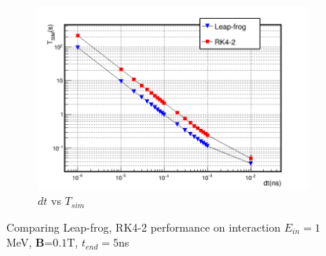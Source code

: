 \documentclass[a4paper,oneside,12pt]{report}
\numberwithin{equation}{chapter}
\begin{document}
{\begin{figure}
    \begin{subfigure}{0.8\textwidth}
        \centering
        \includegraphics[width=\linewidth]{./figures/analiz/mag_lf_rk2_dt-Tsim.png}
        \caption*{$dt$ vs $T_{sim}$}
    \end{subfigure}
    \caption{Comparing Leap-frog, RK4-2 performance on \eB interaction $E_{in}=1$MeV, \textbf{B}=$0.1$T, $t_{end}=5$ns}
    \label{fig:mag_lf_rk2_comparison}
\end{figure} \fi
\begin{figure}[h]
    \centering
    \vspace{-5pt}
    \vspace{1pt}

\end{figure}}
\end{document}
